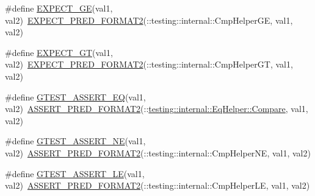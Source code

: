 \begin{DoxyCompactItemize}
\item 
\#define \mbox{\hyperlink{_obj__test_2lib_2googletest-master_2googletest_2include_2gtest_2gtest_8h_ab7a0ff4bfa4d9b27baa118d8b0756ca0}{E\+X\+P\+E\+C\+T\+\_\+\+GE}}(val1,  val2)~\mbox{\hyperlink{_obj__test_2lib_2googletest-release-1_88_81_2googletest_2include_2gtest_2gtest__pred__impl_8h_af0141918615a5e2d5247e9cda8324dae}{E\+X\+P\+E\+C\+T\+\_\+\+P\+R\+E\+D\+\_\+\+F\+O\+R\+M\+A\+T2}}(\+::testing\+::internal\+::\+Cmp\+Helper\+GE, val1, val2)
\item 
\#define \mbox{\hyperlink{_obj__test_2lib_2googletest-master_2googletest_2include_2gtest_2gtest_8h_aa8bc8320813e1abb0016129b636e3b27}{E\+X\+P\+E\+C\+T\+\_\+\+GT}}(val1,  val2)~\mbox{\hyperlink{_obj__test_2lib_2googletest-release-1_88_81_2googletest_2include_2gtest_2gtest__pred__impl_8h_af0141918615a5e2d5247e9cda8324dae}{E\+X\+P\+E\+C\+T\+\_\+\+P\+R\+E\+D\+\_\+\+F\+O\+R\+M\+A\+T2}}(\+::testing\+::internal\+::\+Cmp\+Helper\+GT, val1, val2)
\item 
\#define \mbox{\hyperlink{_obj__test_2lib_2googletest-master_2googletest_2include_2gtest_2gtest_8h_a8a7a47387090810cdfe78933d348182d}{G\+T\+E\+S\+T\+\_\+\+A\+S\+S\+E\+R\+T\+\_\+\+EQ}}(val1,  val2)~\mbox{\hyperlink{_obj__test_2lib_2googletest-release-1_88_81_2googletest_2include_2gtest_2gtest__pred__impl_8h_ac452685a1a98ea3d96eb956a062ee210}{A\+S\+S\+E\+R\+T\+\_\+\+P\+R\+E\+D\+\_\+\+F\+O\+R\+M\+A\+T2}}(\+::\mbox{\hyperlink{classtesting_1_1internal_1_1_eq_helper_a14dd80457029c1ab4a4d04f20003d237}{testing\+::internal\+::\+Eq\+Helper\+::\+Compare}}, val1, val2)
\item 
\#define \mbox{\hyperlink{_obj__test_2lib_2googletest-master_2googletest_2include_2gtest_2gtest_8h_a6fa9bb2b6731eba8f481e40e9e4931b3}{G\+T\+E\+S\+T\+\_\+\+A\+S\+S\+E\+R\+T\+\_\+\+NE}}(val1,  val2)~\mbox{\hyperlink{_obj__test_2lib_2googletest-release-1_88_81_2googletest_2include_2gtest_2gtest__pred__impl_8h_ac452685a1a98ea3d96eb956a062ee210}{A\+S\+S\+E\+R\+T\+\_\+\+P\+R\+E\+D\+\_\+\+F\+O\+R\+M\+A\+T2}}(\+::testing\+::internal\+::\+Cmp\+Helper\+NE, val1, val2)
\item 
\#define \mbox{\hyperlink{_obj__test_2lib_2googletest-master_2googletest_2include_2gtest_2gtest_8h_abef04dcd4a0259d378de7b3b3ffb6730}{G\+T\+E\+S\+T\+\_\+\+A\+S\+S\+E\+R\+T\+\_\+\+LE}}(val1,  val2)~\mbox{\hyperlink{_obj__test_2lib_2googletest-release-1_88_81_2googletest_2include_2gtest_2gtest__pred__impl_8h_ac452685a1a98ea3d96eb956a062ee210}{A\+S\+S\+E\+R\+T\+\_\+\+P\+R\+E\+D\+\_\+\+F\+O\+R\+M\+A\+T2}}(\+::testing\+::internal\+::\+Cmp\+Helper\+LE, val1, val2)

\end{DoxyCompactItemize}
